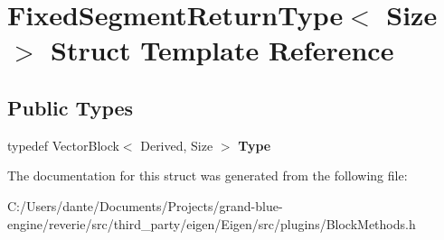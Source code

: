 \hypertarget{struct_fixed_segment_return_type}{}\section{Fixed\+Segment\+Return\+Type$<$ Size $>$ Struct Template Reference}
\label{struct_fixed_segment_return_type}
\subsection*{Public Types}
\begin{DoxyCompactItemize}
\item 
\mbox{\label{struct_fixed_segment_return_type_ac2d746820a67369c7398ad083d752047}} 
typedef Vector\+Block$<$ Derived, Size $>$ {\bfseries Type}
\end{DoxyCompactItemize}


The documentation for this struct was generated from the following file\+:\begin{DoxyCompactItemize}
\item 
C\+:/\+Users/dante/\+Documents/\+Projects/grand-\/blue-\/engine/reverie/src/third\+\_\+party/eigen/\+Eigen/src/plugins/Block\+Methods.\+h\end{DoxyCompactItemize}
